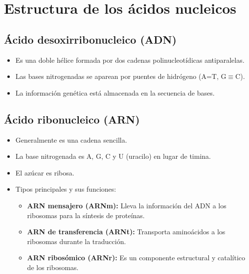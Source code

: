 \section{Estructura de los ácidos nucleicos}


\subsection{Ácido desoxirribonucleico (ADN)}
\begin{itemize}
    \item Es una doble hélice formada por dos cadenas polinucleotídicas antiparalelas.
    \item Las bases nitrogenadas se aparean por puentes de hidrógeno (A=T, G$\equiv$C).
    \item La información genética está almacenada en la secuencia de bases.
\end{itemize}

\subsection{Ácido ribonucleico (ARN)}
\begin{itemize}
    \item Generalmente es una cadena sencilla.
    \item La base nitrogenada es A, G, C y U (uracilo) en lugar de timina.
    \item El azúcar es ribosa.
    \item Tipos principales y sus funciones:
    \begin{itemize}
        \item \textbf{ARN mensajero (ARNm):} Lleva la información del ADN a los ribosomas para la síntesis de proteínas.
        \item \textbf{ARN de transferencia (ARNt):} Transporta aminoácidos a los ribosomas durante la traducción.
        \item \textbf{ARN ribosómico (ARNr):} Es un componente estructural y catalítico de los ribosomas.
    \end{itemize}
\end{itemize}

